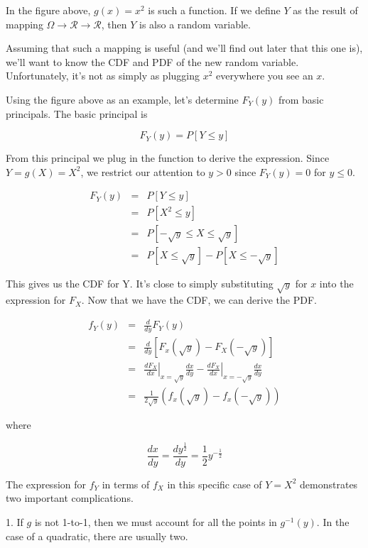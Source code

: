 \documentclass[]{article}
\begin{document}
In the figure above, $g(x) = x^2$ is such a function.  If we define
$Y$ as the result of mapping
$\Omega \rightarrow \mathcal{R} \rightarrow \mathcal{R}$, then
$Y$ is also a random variable.

Assuming that such a mapping is useful (and we'll find out later that
this one is), we'll want to know the CDF and PDF of the new
random variable.  Unfortunately, it's not as simply as plugging
$x^2$ everywhere you see an $x$.

Using the figure above as an example, let's determine $F_Y(y)$ from
basic principals.  The basic principal is

$$
F_Y(y) = P[Y \le y]
$$

From this principal we plug in the function to derive the expression.
Since $Y = g(X) = X^2$, we restrict our attention to $y > 0$ since
$F_Y(y) = 0$ for $y \le 0$.

\begin{eqnarray*}
F_Y(y) &= &P[Y \le y] \\
  &= &P[X^2 \le y] \\
  &= &P\left[-\sqrt{y} \le X \le \sqrt{y}\right] \\
  &= &P\left[X \le \sqrt{y}\right] - P\left[X \le -\sqrt{y}\right]
\end{eqnarray*}

This gives us the CDF for Y.  It's close to simply substituting
$\sqrt{y}$ for $x$ into the expression for $F_X$.  Now that we have
the CDF, we can derive the PDF.

\begin{eqnarray*}
f_Y(y) &= &\frac{d}{dy}F_Y(y) \\
   &= &\frac{d}{dy}\left[ F_x(\sqrt{y}) - F_X(-\sqrt{y}) \right] \\
   &= &\left. \frac{dF_X}{dx} \right\vert_{x=\sqrt{y}} \frac{dx}{dy} - 
   \left. \frac{dF_X}{dx} \right \vert_{x=-\sqrt{y}} \frac{dx}{dy} \\
   &= &\frac{1}{2\sqrt{y}} \left( f_x(\sqrt{y}) - f_x(-\sqrt{y}) \right)
\end{eqnarray*}

where

$$
\frac{dx}{dy} = \frac{d y^{\frac{1}{2}}}{dy} = \frac{1}{2}y^{-\frac{1}{2}}
$$

The expression for $f_Y$ in terms of $f_X$ in this specific case of
$Y = X^2$ demonstrates two important complications.

1. If $g$ is not 1-to-1, then we must account for all the points
   in $g^{-1}(y)$.  In the case of a quadratic, there are usually
   two.
\end{document}
